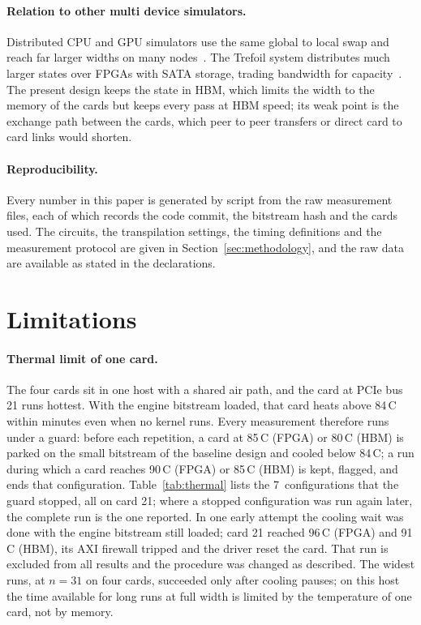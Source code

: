 \documentclass[pdflatex,sn-mathphys-num]{sn-jnl}
\newcommand{\NumThermalStops}{7}
\theoremstyle{thmstyleone}
\theoremstyle{thmstylethree}
\begin{document}
\paragraph{Relation to other multi device simulators.} Distributed CPU and GPU simulators use the same global to local
swap and reach far larger widths on many nodes~\cite{haner2017petabyte,deraedt2019massively,imamura2022mpiqulacs}. The
Trefoil system distributes much larger states over FPGAs with SATA storage, trading bandwidth for
capacity~\cite{niwase2023trefoil,wei2025qutrefoil}. The present design keeps the state in HBM, which limits the width to
the memory of the cards but keeps every pass at HBM speed; its weak point is the exchange path between the cards, which
peer to peer transfers or direct card to card links would shorten.

\paragraph{Reproducibility.} Every number in this paper is generated by script from the raw measurement files, each of
which records the code commit, the bitstream hash and the cards used. The circuits, the transpilation settings, the
timing definitions and the measurement protocol are given in Section~\ref{sec:methodology}, and the raw data are
available as stated in the declarations.
\section{Limitations}\label{sec:limitations}

\paragraph{Thermal limit of one card.} The four cards sit in one host with a shared air path, and the card at PCIe
bus 21 runs hottest. With the engine bitstream loaded, that card heats above 84\,\textdegree C within minutes even
when no kernel runs. Every measurement therefore runs under a guard: before each repetition, a card at 85\,\textdegree C
(FPGA) or 80\,\textdegree C (HBM) is parked on the small bitstream of the baseline design and cooled below
84\,\textdegree C; a run during which a card reaches 90\,\textdegree C (FPGA) or 85\,\textdegree C (HBM) is kept,
flagged, and ends that configuration. Table~\ref{tab:thermal} lists the \NumThermalStops~configurations that the guard
stopped, all on card 21; where a stopped configuration was run again later, the complete run is the one reported. In one early attempt the cooling wait was done
with the engine bitstream still loaded; card 21 reached 96\,\textdegree C (FPGA) and 91\,\textdegree C (HBM), its AXI
firewall tripped and the driver reset the card. That run is excluded from all results and the procedure was changed
as described. The widest runs, at $n=31$ on four cards, succeeded only after cooling pauses; on this host the time
available for long runs at full width is limited by the temperature of one card, not by memory.
\end{document}
